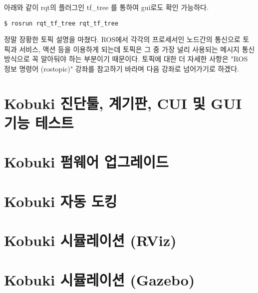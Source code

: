 아래와 같이 rqt의 플러그인 tf\_tree 를 통하여 gui로도 확인 가능하다.

\vspace{\baselineskip}
\begin{lstlisting}[language=ROS]
$ rosrun rqt_tf_tree rqt_tf_tree 
\end{lstlisting}

정말 장황한 토픽 설명을 마쳤다. ROS에서 각각의 프로세서인 노드간의 통신으로 토픽과 서비스, 액션 등을 이용하게 되는데 토픽은 그 중 가장 널리 사용되는 메시지 통신 방식으로 꼭 알아둬야 하는 부분이기 때문이다. 토픽에 대한 더 자세한 사항은 "ROS 정보 명령어 (rostopic)" 강좌를 참고하기 바라며 다음 강좌로 넘어가기로 하겠다.

\section{Kobuki 진단툴, 계기판, CUI 및 GUI 기능 테스트}

\section{Kobuki 펌웨어 업그레이드}

\section{Kobuki 자동 도킹}

\section{Kobuki 시뮬레이션 (RViz)}

\section{Kobuki 시뮬레이션 (Gazebo)}

